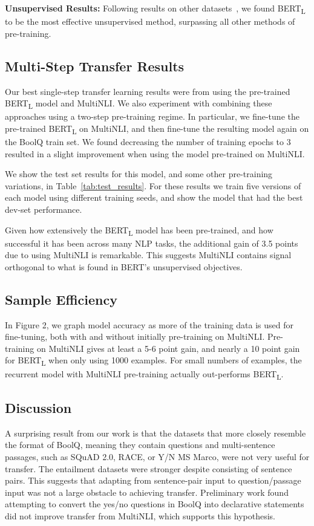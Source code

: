 \textbf{Unsupervised Results:} Following results on other datasets~\cite{glue}, we found BERT\textsubscript{L} to be the most effective unsupervised method, surpassing all other methods of pre-training.

\subsection{Multi-Step Transfer Results}

Our best single-step transfer learning results were from using the pre-trained BERT\textsubscript{L} model and MultiNLI. We also experiment with combining these approaches using a two-step pre-training regime. In particular, we fine-tune the pre-trained BERT\textsubscript{L} on MultiNLI, and then fine-tune the resulting model again on the BoolQ train set. We found decreasing the number of training epochs to 3 resulted in a slight improvement when using the model pre-trained on MultiNLI.

We show the test set results for this model, and some other pre-training variations, in Table~\ref{tab:test_results}. For these results we train five versions of each model using different training seeds, and show the model that had the best dev-set performance.

Given how extensively the BERT\textsubscript{L} model has been pre-trained, and how successful it has been across many NLP tasks, the additional gain of 3.5 points due to using MultiNLI is remarkable. This suggests MultiNLI contains signal orthogonal to what is found in BERT's unsupervised objectives.

\subsection{Sample Efficiency}

In Figure 2, we graph model accuracy as more of the training data is used for fine-tuning, both with and without initially pre-training on MultiNLI. Pre-training on MultiNLI gives at least a 5-6 point gain, and nearly a 10 point gain for BERT\textsubscript{L} when only using 1000 examples. For small numbers of examples, the recurrent model with MultiNLI pre-training actually out-performs BERT\textsubscript{L}.

\subsection{Discussion}
A surprising result from our work is that the datasets that more closely resemble the format of BoolQ, meaning they contain questions and multi-sentence passages, such as SQuAD 2.0, RACE, or Y/N MS Marco, were not very useful for transfer. The entailment datasets were stronger despite consisting of sentence pairs. This suggests that adapting from sentence-pair input to question/passage input was not a large obstacle to achieving transfer. Preliminary work found attempting to convert the yes/no questions in BoolQ into declarative statements did not improve transfer from MultiNLI, which supports this hypothesis.

